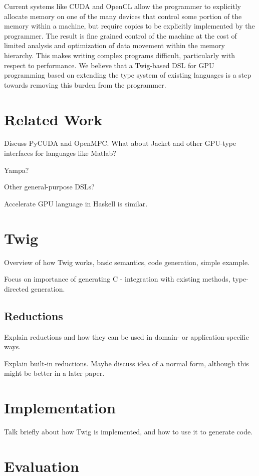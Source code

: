 \documentclass[11pt]{article}
\begin{document}
Current systems like CUDA and OpenCL allow the programmer to explicitly
allocate memory on one of the many devices that control some portion of 
the memory within a machine, but require copies to be explicitly implemented
by the programmer.  The result is fine grained control of the machine at the
cost of limited analysis and optimization of data movement within the memory
hierarchy.  This makes writing complex programs difficult, particularly with
respect to performance.  We believe that a Twig-based DSL for GPU programming
based on extending the type system of existing languages is a step towards
removing this burden from the programmer.

\section{Related Work}

Discuss PyCUDA and OpenMPC. What about Jacket and other GPU-type interfaces
for languages like Matlab?

Yampa?

Other general-purpose DSLs?

Accelerate GPU language in Haskell is similar.  

\section{Twig}

Overview of how Twig works, basic semantics, code generation, simple example.

Focus on importance of generating C - integration with existing methods, type-directed generation.

\subsection{Reductions}

Explain reductions and how they can be used in domain- or application-specific
ways.

Explain built-in reductions. Maybe discuss idea of a normal form, although
this might be better in a later paper.

\section{Implementation}

Talk briefly about how Twig is implemented, and how to use it to generate
code.

\section{Evaluation}
\end{document}

